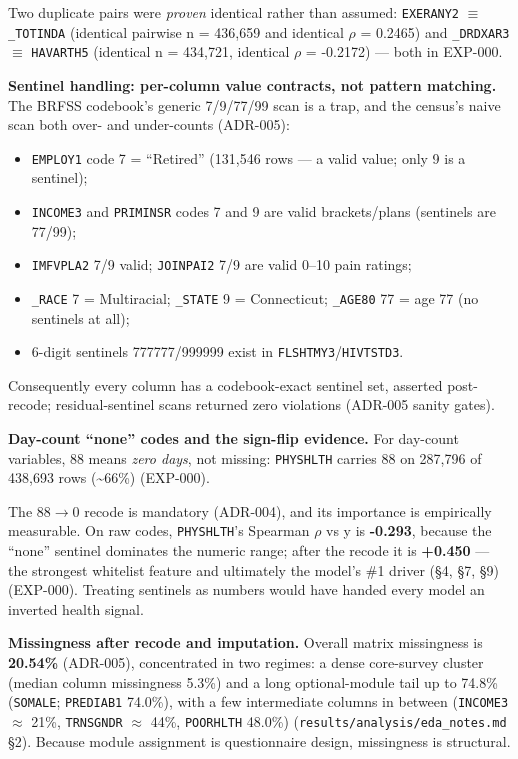 \documentclass[11pt,a4paper]{article}
\providecommand{\tightlist}{\setlength{\itemsep}{2pt}\setlength{\parskip}{0pt}}
\begin{document}
Two duplicate pairs were \emph{proven} identical rather than assumed:
\texttt{EXERANY2} $\equiv$ \texttt{\_TOTINDA} (identical pairwise n = 436,659
and identical $\rho$ = 0.2465) and \texttt{\_DRDXAR3} $\equiv$ \texttt{HAVARTH5}
(identical n = 434,721, identical $\rho$ = -0.2172) --- both in EXP-000.

\textbf{Sentinel handling: per-column value contracts, not pattern
matching.} The BRFSS codebook's generic 7/9/77/99 scan is a trap, and
the census's naive scan both over- and under-counts (ADR-005):

\begin{itemize}
\tightlist
\item
  \texttt{EMPLOY1} code 7 = ``Retired'' (131,546 rows --- a valid value;
  only 9 is a sentinel);
\item
  \texttt{INCOME3} and \texttt{PRIMINSR} codes 7 and 9 are valid
  brackets/plans (sentinels are 77/99);
\item
  \texttt{IMFVPLA2} 7/9 valid; \texttt{JOINPAI2} 7/9 are valid 0--10
  pain ratings;
\item
  \texttt{\_RACE} 7 = Multiracial; \texttt{\_STATE} 9 = Connecticut;
  \texttt{\_AGE80} 77 = age 77 (no sentinels at all);
\item
  6-digit sentinels 777777/999999 exist in
  \texttt{FLSHTMY3}/\texttt{HIVTSTD3}.
\end{itemize}

Consequently every column has a codebook-exact sentinel set, asserted
post-recode; residual-sentinel scans returned zero violations (ADR-005
sanity gates).

\textbf{Day-count ``none'' codes and the sign-flip evidence.} For
day-count variables, 88 means \emph{zero days}, not missing:
\texttt{PHYSHLTH} carries 88 on 287,796 of 438,693 rows
(\textasciitilde66\%) (EXP-000).

The 88$\rightarrow$0 recode is mandatory (ADR-004), and its importance is
empirically measurable. On raw codes, \texttt{PHYSHLTH}'s Spearman $\rho$ vs
y is \textbf{-0.293}, because the ``none'' sentinel dominates the
numeric range; after the recode it is \textbf{+0.450} --- the strongest
whitelist feature and ultimately the model's \#1 driver (\S{}4, \S{}7, \S{}9)
(EXP-000). Treating sentinels as numbers would have handed every model
an inverted health signal.

\textbf{Missingness after recode and imputation.} Overall matrix
missingness is \textbf{20.54\%} (ADR-005), concentrated in two regimes:
a dense core-survey cluster (median column missingness 5.3\%) and a long
optional-module tail up to 74.8\% (\texttt{SOMALE}; \texttt{PREDIAB1}
74.0\%), with a few intermediate columns in between (\texttt{INCOME3} $\approx$
21\%, \texttt{TRNSGNDR} $\approx$ 44\%, \texttt{POORHLTH} 48.0\%)
(\texttt{results/analysis/eda\_notes.md} \S{}2). Because module assignment
is questionnaire design, missingness is structural.
\end{document}
